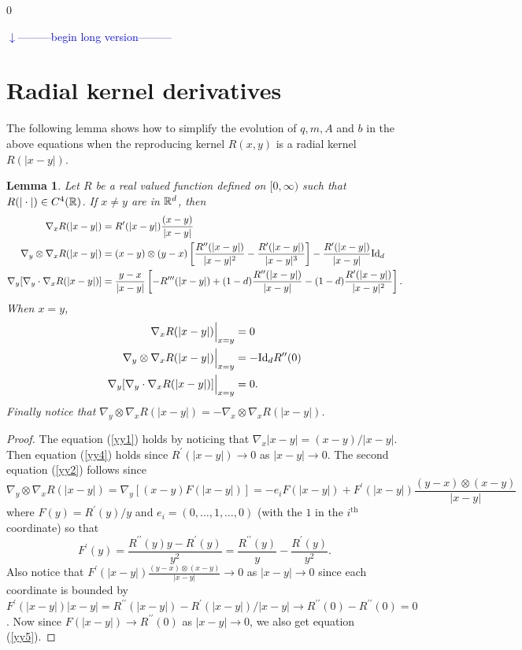 \documentclass[noinfoline]{imsart}
\newtheorem{lemma}{Lemma}
\def\Ver{1}
\def\LongVer{0}
\begin{document}
\if\Ver\LongVer{
{\flushleft\textcolor{blue}{$\downarrow$---------begin long version---------}}\newline
\section{Radial kernel derivatives}
The following lemma shows how to simplify the evolution of $q,m, A$ and $b$ in the above equations when the reproducing kernel $R(x,y)$ is a radial kernel $R(|x-y|)$.
\begin{lemma}
Let $R$ be a real valued function defined on $[0,\infty)$ such that  $R(|\cdot|)\in C^4(\Bbb R)$. If $x\neq y$ are in $\Bbb R^d$, then
\begin{align}
\nabla_x R(|x-y|)&=R^\prime(|x-y|)\frac{(x-y)}{|x-y|} \label{yy1}\\
\nabla_y \otimes \nabla_x R(|x-y|)&=(x-y)\otimes (y-x) \left[ \frac{R^{\prime\prime}(|x-y|)}{|x-y|^2}  -  \frac{R^{\prime}(|x-y|)}{|x-y|^3} \right]  - \frac{R^{\prime}(|x-y|) }{|x-y|} \text{\rm Id}_d  \label{yy2} \\
\nabla_{y} [\nabla_y \cdot \nabla_x R(|x-y|)]&= \frac{y-x}{|x-y|}\left[-R^{\prime\prime\prime}(|x-y|)+ (1-d)\frac{R^{\prime\prime}(|x-y|)}{|x-y|} -   (1-d)\frac{R^{\prime}(|x-y|)}{|x-y|^2}  \right].  \label{yy3}
\end{align}
When $x=y$,
\begin{align}
\nabla_x R(|x-y|)\Bigr|_{x=y}&=0   \label{yy4}\\
\nabla_y \otimes \nabla_x R(|x-y|)\Bigr|_{x=y}&= -\text{\rm Id}_d  R^{\prime\prime}(0)  \label{yy5}\\
\nabla_{y} [\nabla_y \cdot \nabla_x R(|x-y|)]\Bigr|_{x=y}&=0.    \label{yy6}
\end{align}
Finally notice that $\nabla_y \otimes \nabla_x R(|x-y|)=-\nabla_x \otimes \nabla_x R(|x-y|)$.
\end{lemma}

\begin{proof}
The equation (\ref{yy1}) holds by noticing that $\nabla_x |x-y|= (x-y)/|x-y|$. Then equation  (\ref{yy4}) holds since $R^{\prime}(|x-y|)\rightarrow 0$ as $|x-y|\rightarrow 0$. The second equation (\ref{yy2}) follows since
\[ \nabla_y \otimes \nabla_x R(|x-y|)=  \nabla_y  [(x-y) F(|x-y|)]=-e_i F(|x-y|)+ F^\prime(|x-y|) \frac{(y-x)\otimes (x-y)}{|x-y|}\]
where $F(y)=R^\prime(y)/y$ and $e_i=(0,\ldots,1,\ldots,0)$ (with the $1$ in the $i^\text{th}$ coordinate) so that
\[ F^\prime(y)=\frac{R^{\prime\prime}(y)y- R^{\prime}(y)}{y^2} =\frac{R^{\prime\prime}(y)}{y}-\frac{ R^{\prime}(y)}{y^2}.\]
Also notice that $ F^\prime(|x-y|) \frac{(y-x)\otimes (x-y)}{|x-y|}\rightarrow 0$ as $|x-y|\rightarrow 0$ since each coordinate is bounded by $F^\prime(|x-y|) |x-y|= R^{\prime\prime}(|x-y|)- R^\prime(|x-y|)/|x-y|\rightarrow R^{\prime\prime}(0)- R^{\prime\prime}(0)=0$. Now since $F(|x-y|)\rightarrow R^{\prime\prime}(0)$ as $|x-y|\rightarrow 0$, we also get equation (\ref{yy5}).



\end{proof}}
\end{document}
